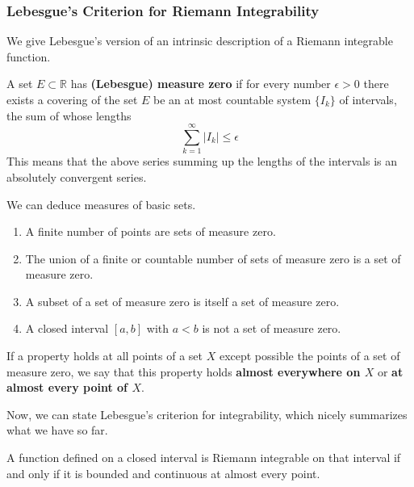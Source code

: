   \subsubsection{Lebesgue's Criterion for Riemann Integrability}
  We give Lebesgue's version of an intrinsic description of a Riemann integrable function. 

  \begin{definition}[Measure]
    A set $E \subset \mathbb{R}$ has \textbf{(Lebesgue) measure zero} if for every number $\epsilon > 0$ there exists a covering of the set $E$ be an at most countable system $\{I_k\}$ of intervals, the sum of whose lengths 
    \[\sum_{k=1}^\infty |I_k| \leq \epsilon\]
    This means that the above series summing up the lengths of the intervals is an absolutely convergent series. 
  \end{definition}

  \begin{lemma}
    We can deduce measures of basic sets. 
    \begin{enumerate}
      \item A finite number of points are sets of measure zero. 
      \item The union of a finite or countable number of sets of measure zero is a set of measure zero. \item A subset of a set of measure zero is itself a set of measure zero. 
      \item A closed interval $[a, b]$ with $a<b$ is not a set of measure zero. 
    \end{enumerate}
  \end{lemma}

  \begin{definition}
    If a property holds at all points of a set $X$ except possible the points of a set of measure zero, we say that this property holds \textbf{almost everywhere on $X$} or \textbf{at almost every point of $X$}. 
  \end{definition}

  Now, we can state Lebesgue's criterion for integrability, which nicely summarizes what we have so far. 

  \begin{theorem}
  A function defined on a closed interval is Riemann integrable on that interval if and only if it is bounded and continuous at almost every point. 
  \end{theorem}

